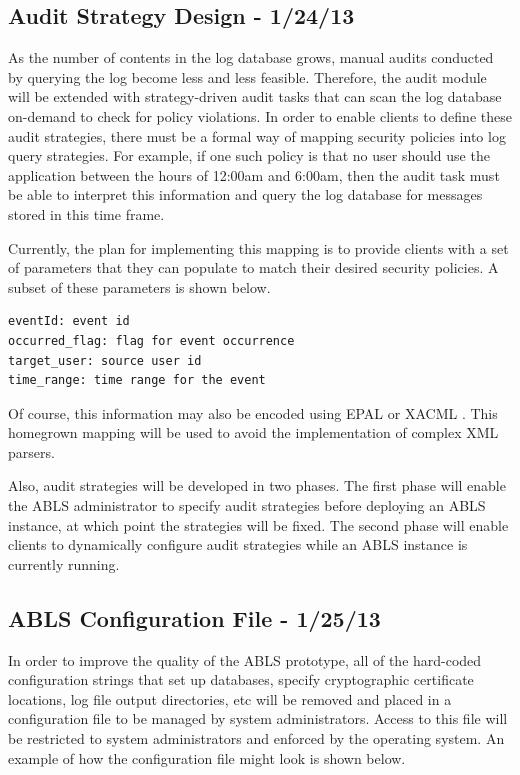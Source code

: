 \documentclass{sig-alternate}
\begin{document}
\subsection{Audit Strategy Design - 1/24/13}
As the number of contents in the log database grows, manual audits conducted by querying the log become less and less 
feasible. Therefore, the audit module will be extended with strategy-driven audit tasks that can scan the log database 
on-demand to check for policy violations. In order to enable clients to define these audit strategies, there must be a 
formal way of mapping security policies into log query strategies. For example, if one such policy is that no user should use 
the application between the hours of 12:00am and 6:00am, then the audit task must be able to interpret this information
and query the log database for messages stored in this time frame. 

Currently, the plan for implementing this mapping is to provide clients with a set of parameters that they can populate to
match their desired security policies. A subset of these parameters is shown below.
\begin{lstlisting}
eventId: event id
occurred_flag: flag for event occurrence
target_user: source user id
time_range: time range for the event
\end{lstlisting}

Of course, this information may also be encoded using EPAL or XACML \cite{Anderson2005-ComparisonEAPL_XACML}.
This homegrown mapping will be used to avoid the implementation of complex XML parsers. 

Also, audit strategies will be developed in two phases. The first phase will enable the ABLS administrator
to specify audit strategies before deploying an ABLS instance, at which point the strategies will be fixed. The second
phase will enable clients to dynamically configure audit strategies while an ABLS instance is currently running.

\subsection{ABLS Configuration File - 1/25/13} 
In order to improve the quality of the ABLS prototype, all of the hard-coded configuration strings that set up databases,
specify cryptographic certificate locations, log file output directories, etc will be removed and placed in a configuration file
to be managed by system administrators. Access to this file will be restricted to system administrators and enforced by the 
operating system. An example of how the configuration file might look is shown below.
\end{document}
